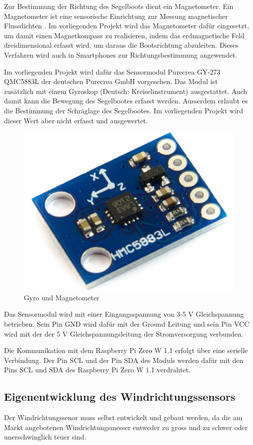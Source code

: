 Zur Bestimmung der Richtung des Segelboots dient ein Magnetometer. Ein Magnetometer ist eine sensorische Einrichtung zur Messung magnetischer Flussdichten \cite{noauthor_magnetometer_2023}. Im vorliegenden Projekt wird das Magnetometer dafür eingesetzt, um damit einen Magnetkompass zu realisieren, indem das erdmagnetische Feld dreidimensional erfasst wird, um daraus die Bootsrichtung abzuleiten. Dieses Verfahren wird auch in Smartphones zur Richtungsbestimmung angewendet.

Im vorliegenden Projekt wird dafür das Sensormodul Purecrea GY-273 QMC5883L der deutschen Purecrea GmbH vorgesehen. Das Modul ist \\ zusätzlich mit einem Gyroskop (Deutsch: Kreiselinstrument) ausgestattet. Auch damit kann die Bewegung des Segelbootes erfasst werden. Ausserdem erlaubt es die Bestimmung der Schräglage des Segelbootes. Im vorliegenden Projekt wird dieser Wert aber nicht erfasst und ausgewertet.

\begin{figure}[H]
    \centering
    \includegraphics[width=0.5\linewidth]{assets/magnetometer.jpg}
    \caption{Gyro und Magnetometer}
\end{figure}

Das Sensormodul wird mit einer Eingangsspannung von 3-5 V Gleichspannung betrieben. Sein Pin GND wird dafür mit der Ground Leitung und sein Pin VCC wird mit der der 5 V Gleichspannungsleitung der Stromversorgung verbunden.

Die Kommunikation mit dem Raspberry Pi Zero W 1.1 erfolgt über eine serielle Verbindung. Der Pin SCL und der Pin SDA des Moduls werden dafür mit den Pins SCL und SDA des Raspberry Pi Zero W 1.1 verdrahtet.

\subsection{Eigenentwicklung des Windrichtungssensors}
Der Windrichtungssenor muss selbst entwickelt und gebaut werden, da die am Markt angebotenen Windrichtungsmesser entweder zu gross und zu schwer oder unerschwinglich teuer sind.

